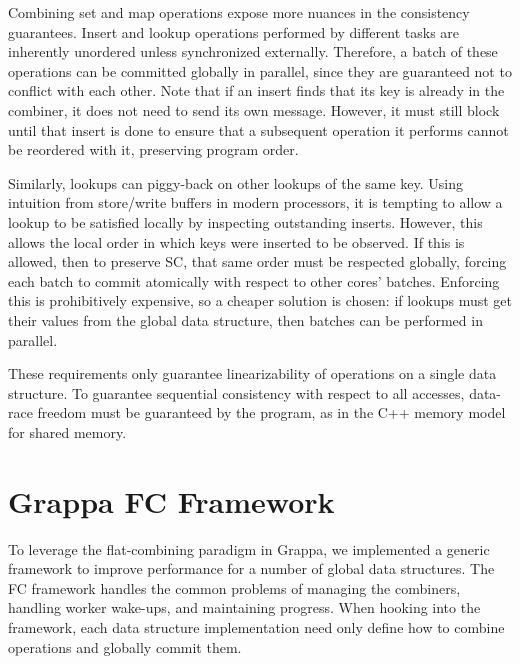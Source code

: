 Combining set and map operations expose more nuances in the consistency guarantees.
Insert and lookup operations performed by different tasks are inherently unordered unless synchronized externally.
Therefore, a batch of these operations can be committed globally in parallel, since they are guaranteed not to conflict with each other.
Note that if an insert finds that its key is already in the combiner, it does not need to send its own message. However, it must still block until that insert is done to ensure that a subsequent operation it performs cannot be reordered with it, preserving program order.

Similarly, lookups can piggy-back on other lookups of the same key.
Using intuition from store/write buffers in modern processors, it is tempting to allow a lookup to be satisfied locally by inspecting outstanding inserts.
However, this allows the local order in which keys were inserted to be observed.
If this is allowed, then to preserve SC, that same order must be respected globally, forcing each batch to commit atomically with respect to other cores' batches. Enforcing this is prohibitively expensive, so a cheaper solution is chosen: if lookups must get their values from the global data structure, then batches can be performed in parallel.

These requirements only guarantee linearizability of operations on a single data structure. To guarantee sequential consistency with respect to all accesses, data-race freedom must be guaranteed by the program, as in the C++ memory model for shared memory.

\section{Grappa FC Framework}
To leverage the flat-combining paradigm in Grappa, we implemented a generic framework to improve performance for a number of global data structures. The FC framework handles the common problems of managing the combiners, handling worker wake-ups, and maintaining progress. When hooking into the framework, each data structure implementation need only define how to combine operations and globally commit them.

